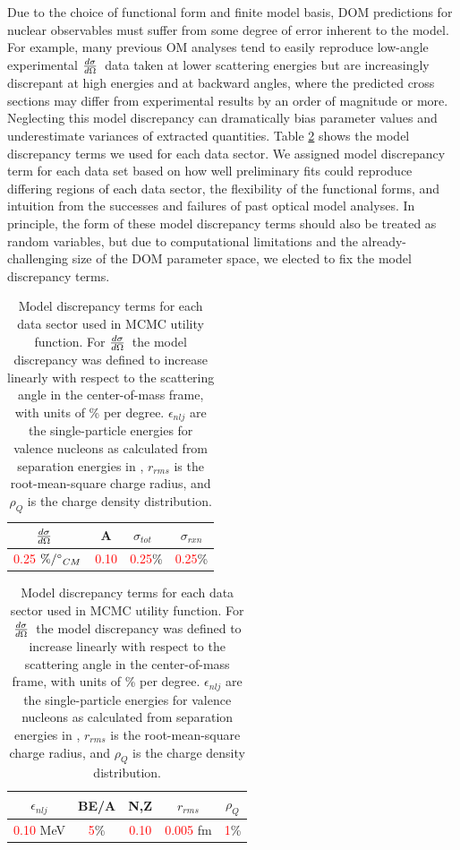 \documentclass[twocolumn,secnumarabic,amssymb, nobibnotes, aps, prl,
superscriptaddress, nobalancelastpage]{revtex4}
\newcommand{\tot}{\ensuremath{\sigma_{tot}}}
\newcommand{\rxn}{\ensuremath{\sigma_{rxn}}}
\newcommand{\el}{\ensuremath{\frac{\lowercase{d}\sigma}{\lowercase{d}\Omega}}}
\begin{document}
Due to the choice of functional form and finite model basis,
DOM predictions for nuclear observables must suffer from some degree of error
inherent to the model. For example, many previous
OM analyses tend to easily reproduce low-angle experimental \el\ data taken at
lower scattering energies but are increasingly discrepant at high energies
and at backward angles, where the predicted cross sections may
differ from experimental results by an order of magnitude or more. 
Neglecting this model discrepancy can
dramatically bias parameter values and underestimate variances of extracted
quantities. Table \ref{ModelDiscrepancyTable} shows the model discrepancy terms we used 
for each data sector. We assigned model discrepancy term for each data set
based on how well preliminary fits could reproduce differing regions of each
data sector, the flexibility of the functional forms, and intuition
from the successes and failures of past optical model analyses.
In principle, the form of these model discrepancy terms should also be treated as random
variables, but due to computational limitations and the already-challenging size
of the DOM parameter space, we elected to fix the model discrepancy terms.

\begin{table}[tb]
    \centering
    \bgroup
    \def\arraystretch{1.8}%
    \begin{tabular}{ c c c c }
        \el\ & A & \tot\ & \rxn \\
        \hline
        \textcolor{red}{0.25} $\%/\degree_{CM}$ & \textcolor{red}{0.10}
            & \textcolor{red}{0.25}\% & \textcolor{red}{0.25}\% \\
    \end{tabular}
    \begin{tabular}{ c c c c c }
        $\epsilon_{nlj}$ & BE/A & N,Z & $r_{rms}$ & $\rho_{Q}$ \\
        \hline
        \textcolor{red}{0.10} MeV & \textcolor{red}{5}\% & \textcolor{red}{0.10}
        & \textcolor{red}{0.005} fm & \textcolor{red}{1}\%\\
    \end{tabular}
    \egroup
    \caption{Model discrepancy terms for each data sector used in
        MCMC utility function. For \el\, the model discrepancy was defined to
        increase linearly with respect to the scattering angle in the
        center-of-mass frame, with units of \% per degree. $\epsilon_{nlj}$
        are the single-particle energies for valence nucleons as calculated
        from separation energies in \cite{AME2016},
        $r_{rms}$ is the root-mean-square charge radius, and
    $\rho_{Q}$ is the charge density distribution.}
    \label{ModelDiscrepancyTable}
\end{table}
\end{document}
